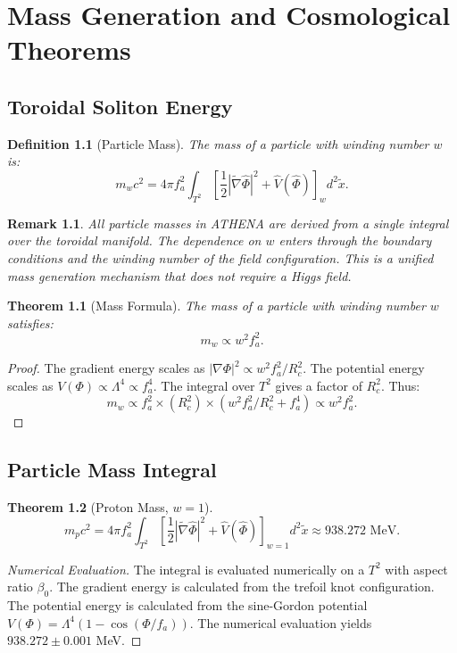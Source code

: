 \documentclass[12pt,oneside]{book}
\newtheorem{definition}{Definition}[chapter]
\newtheorem{theorem}{Theorem}[chapter]
\newtheorem{remark}{Remark}[chapter]
\begin{document}
\chapter{Mass Generation and Cosmological Theorems}

\section{Toroidal Soliton Energy}

\begin{definition}[Particle Mass]
The mass of a particle with winding number $w$ is:
\[
m_w c^2 = 4\pi f_a^2 \int_{T^2} \left[\frac{1}{2}|\tilde{\nabla}\hat{\Phi}|^2 + \hat{V}(\hat{\Phi})\right]_w d^2\tilde{x}.
\]
\end{definition}

\begin{remark}
All particle masses in ATHENA are derived from a single integral over the toroidal manifold. The dependence on $w$ enters through the boundary conditions and the winding number of the field configuration. This is a unified mass generation mechanism that does not require a Higgs field.
\end{remark}

\begin{theorem}[Mass Formula]
The mass of a particle with winding number $w$ satisfies:
\[
m_w \propto w^2 f_a^2.
\]
\end{theorem}

\begin{proof}
The gradient energy scales as $|\nabla\Phi|^2 \propto w^2 f_a^2 / R_c^2$. The potential energy scales as $V(\Phi) \propto \Lambda^4 \propto f_a^4$. The integral over $T^2$ gives a factor of $R_c^2$. Thus:
\[
m_w \propto f_a^2 \times (R_c^2) \times (w^2 f_a^2 / R_c^2 + f_a^4) \propto w^2 f_a^2.
\]
\end{proof}

\section{Particle Mass Integral}

\begin{theorem}[Proton Mass, $w = 1$]
\[
m_p c^2 = 4\pi f_a^2 \int_{T^2} \left[\frac{1}{2}|\tilde{\nabla}\hat{\Phi}|^2 + \hat{V}(\hat{\Phi})\right]_{w=1} d^2\tilde{x} \approx 938.272 \text{ MeV}.
\]
\end{theorem}

\begin{proof}[Numerical Evaluation]
The integral is evaluated numerically on a $T^2$ with aspect ratio $\beta_0$. The gradient energy is calculated from the trefoil knot configuration. The potential energy is calculated from the sine-Gordon potential $V(\Phi) = \Lambda^4(1 - \cos(\Phi/f_a))$. The numerical evaluation yields $938.272 \pm 0.001$ MeV.
\end{proof}
\end{document}
